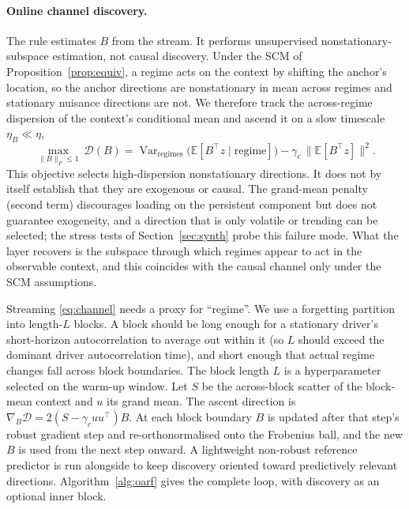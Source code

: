 \documentclass[12pt]{article}
\theoremstyle{plain}
\theoremstyle{remark}
\newcommand{\E}{\mathbb{E}}
\DeclareMathOperator*{\Var}{Var}
\begin{document}
\paragraph{Online channel discovery.}
The rule estimates $B$ from the stream. It performs unsupervised nonstationary-subspace estimation, not causal discovery. Under the SCM of
Proposition~\ref{prop:equiv}, a regime acts on the context by shifting the anchor's
location, so the anchor directions are nonstationary in mean across regimes and
stationary nuisance directions are not. We therefore track the across-regime
dispersion of the context's conditional mean and ascend it on a slow timescale
$\eta_B\ll\eta$,
\begin{equation}\label{eq:channel}
\max_{\|B\|_F\le 1}\ \mathcal{D}(B)=\Var_{\text{regimes}}\!\big(\E[B^\top z\mid\text{regime}]\big)
 -\gamma_c\,\big\|\E[B^\top z]\big\|^2 .
\end{equation}
This objective selects high-dispersion nonstationary directions. It does not by itself
establish that they are exogenous or causal. The grand-mean penalty (second term)
discourages loading on the persistent component but does not guarantee exogeneity,
and a direction that is only volatile or trending can be selected; the stress tests of
Section~\ref{sec:synth} probe this failure mode. What the layer recovers is the
subspace through which regimes appear to act in the observable context, and this
coincides with the causal channel only under the SCM assumptions.

Streaming \eqref{eq:channel} needs a proxy for ``regime''. We use a forgetting
partition into length-$L$ blocks. A block should be long enough for a stationary
driver's short-horizon autocorrelation to average out within it (so $L$ should exceed
the dominant driver autocorrelation time), and short enough that actual regime changes
fall across block boundaries. The block length $L$ is a hyperparameter selected on the warm-up window. Let $S$ be
the across-block scatter of the block-mean context and $u$ its grand mean. The ascent
direction is $\nabla_B\mathcal{D}=2(S-\gamma_c uu^\top)B$. At each block boundary $B$
is updated after that step's robust gradient step and re-orthonormalised onto the
Frobenius ball, and the new $B$ is used from the next step onward. A lightweight
non-robust reference predictor is run alongside to keep discovery oriented toward
predictively relevant directions. Algorithm~\ref{alg:oarf} gives the complete loop,
with discovery as an optional inner block.
\end{document}
